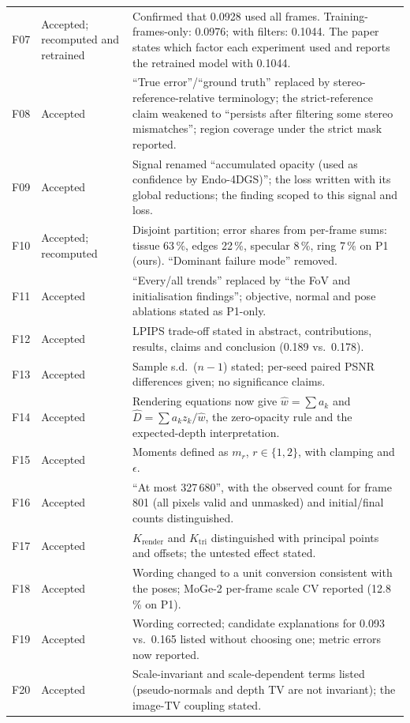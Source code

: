 \documentclass[10pt,a4paper]{article}
\begin{document}
\begin{longtable}{@{}p{}p{}p{}@{}}
F07 & Accepted; recomputed and retrained & Confirmed that 0.0928 used all frames. Training-frames-only: 0.0976; with filters: 0.1044. The paper states which factor each experiment used and reports the retrained model with 0.1044. \\
F08 & Accepted & ``True error''/``ground truth'' replaced by stereo-reference-relative terminology; the strict-reference claim weakened to ``persists after filtering some stereo mismatches''; region coverage under the strict mask reported. \\
F09 & Accepted & Signal renamed ``accumulated opacity (used as confidence by Endo-4DGS)''; the loss written with its global reductions; the finding scoped to this signal and loss. \\
F10 & Accepted; recomputed & Disjoint partition; error shares from per-frame sums: tissue 63\,\%, edges 22\,\%, specular 8\,\%, ring 7\,\% on P1 (ours). ``Dominant failure mode'' removed. \\
F11 & Accepted & ``Every/all trends'' replaced by ``the FoV and initialisation findings''; objective, normal and pose ablations stated as P1-only. \\
F12 & Accepted & LPIPS trade-off stated in abstract, contributions, results, claims and conclusion (0.189 vs.\ 0.178). \\
F13 & Accepted & Sample s.d.\ ($n{-}1$) stated; per-seed paired PSNR differences given; no significance claims. \\
F14 & Accepted & Rendering equations now give $\hat w=\sum a_k$ and $\hat D=\sum a_k z_k/\hat w$, the zero-opacity rule and the expected-depth interpretation. \\
F15 & Accepted & Moments defined as $m_r$, $r\in\{1,2\}$, with clamping and $\epsilon$. \\
F16 & Accepted & ``At most 327\,680'', with the observed count for frame 801 (all pixels valid and unmasked) and initial/final counts distinguished. \\
F17 & Accepted & $K_{\mathrm{render}}$ and $K_{\mathrm{tri}}$ distinguished with principal points and offsets; the untested effect stated. \\
F18 & Accepted & Wording changed to a unit conversion consistent with the poses; MoGe-2 per-frame scale CV reported (12.8\,\% on P1). \\
F19 & Accepted & Wording corrected; candidate explanations for 0.093 vs.\ 0.165 listed without choosing one; metric errors now reported. \\
F20 & Accepted & Scale-invariant and scale-dependent terms listed (pseudo-normals and depth TV are not invariant); the image-TV coupling stated. \\

\end{longtable}
\end{document}
